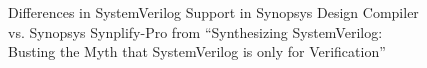 
\begin{figure}[t]
    \centering
    \caption[
        Inconsistencies in SystemVerilog Support in synthesis tools
    ]{
        Differences in SystemVerilog Support in Synopsys Design Compiler vs. Synopsys Synplify-Pro from \enquote{Synthesizing SystemVerilog: Busting the Myth that SystemVerilog is only for Verification} \cite{sutherland}
    }
    \label{fig:dc_vs_synplify}
\end{figure}
